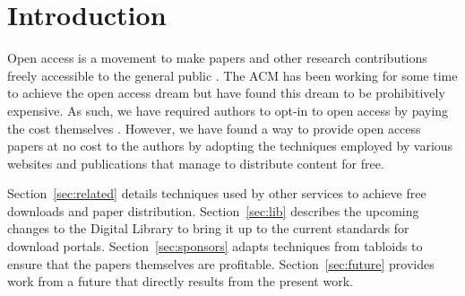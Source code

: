\section{Introduction}
Open access is a movement to make papers and other research contributions
freely accessible to the general public \cite{oa}.
The ACM has been working for some time to achieve the open access dream but
have found this dream to be prohibitively expensive.
As such, we have required authors to opt-in to open access by paying the cost
themselves \cite{auth}.
However, we have found a way to provide open access papers at no cost to the
authors by adopting the techniques employed by various websites and
publications that manage to distribute content for free.

Section~\ref{sec:related} details techniques used by other services to achieve
free downloads and paper distribution.
Section~\ref{sec:lib} describes the upcoming changes to the Digital Library to
bring it up to the current standards for download portals.
Section~\ref{sec:sponsors} adapts techniques from tabloids to ensure that
the papers themselves are profitable.
Section~\ref{sec:future} provides work from a future that directly results from the present work.

